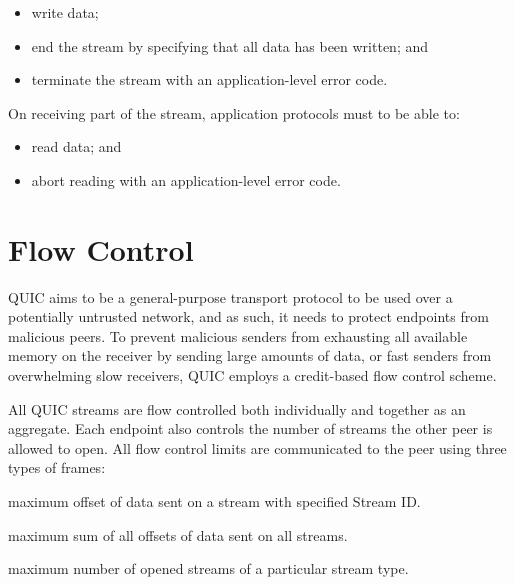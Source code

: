 \begin{itemize}

  \item write data;

  \item end the stream by specifying that all data has been written; and

  \item terminate the stream with an application-level error code.

\end{itemize}

On receiving part of the stream, application protocols must to be able to:

\begin{itemize}

  \item read data; and

  \item abort reading with an application-level error code.

\end{itemize}

\section{Flow Control}

QUIC aims to be a general-purpose transport protocol to be used over a potentially untrusted
network, and as such, it needs to protect endpoints from malicious peers. To prevent malicious
senders from exhausting all available memory on the receiver by sending large amounts of data, or
fast senders from overwhelming slow receivers, QUIC employs a credit-based flow control scheme.

All QUIC streams are flow controlled both individually and together as an aggregate. Each endpoint
also controls the number of streams the other peer is allowed to open. All flow control limits are
communicated to the peer using three types of frames:

\begin{itemize}

\litem{\MAXSTREAMDATA{}} maximum offset of data sent on a stream with specified Stream ID\@.

\litem{\MAXDATA{}} maximum sum of all offsets of data sent on all streams.

\litem{\MAXSTREAMS{}} maximum number of opened streams of a particular stream type.

\end{itemize}

